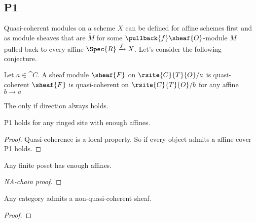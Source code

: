 \subsection{P1}

Quasi-coherent modules on a scheme $X$ can be defined for affine schemes first and  as module sheaves that are $\tilde{M}$ for some $\pullback{f}\sheaf{O}$-module $M$ pulled back to every affine $\Spec{R}\xrightarrow{f} X$. 
Let's consider the following conjecture. 

\begin{conjecture}[P1]
Let $a\in \cat{C}$.
A sheaf module $\sheaf{F}$ on $\rsite{C}{T}{O}/a$ is quasi-coherent \iff $\sheaf{F}$ is quasi-coherent on $\rsite{C}{T}{O}/b$ for any affine $b\rightarrow a$
\end{conjecture}

\begin{remark}
The only if direction always holds.
\end{remark}



\begin{lemma}
P1 holds for any ringed site with enough affines.
\end{lemma}

\begin{proof}
Quasi-coherence is a local property. So if every object admits a affine cover P1 holds.
\end{proof}

\begin{lemma}
Any finite poset has enough affines.
\end{lemma}

\begin{proof}[NA-chain proof]

\end{proof}

\begin{lemma}
Any category admits a non-quasi-coherent sheaf.
\end{lemma}

\begin{proof}

\end{proof}

\begin{example}

\end{example}

\begin{example}

\end{example}

\begin{example}
\end{example}

\begin{example}

\end{example}